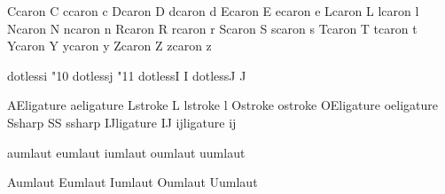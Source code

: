  Ccaron {\buildtextaccent\textcaron C}
 ccaron {\buildtextaccent\textcaron c}
 Dcaron {\buildtextaccent\textcaron D}
 dcaron {\buildtextaccent\textcaron d}
 Ecaron {\buildtextaccent\textcaron E}
 ecaron {\buildtextaccent\textcaron e}
 Lcaron {\buildtextaccent\textcaron L}
 lcaron {\buildtextaccent\textcaron l}
 Ncaron {\buildtextaccent\textcaron N}
 ncaron {\buildtextaccent\textcaron n}
 Rcaron {\buildtextaccent\textcaron R}
 rcaron {\buildtextaccent\textcaron r}
 Scaron {\buildtextaccent\textcaron S}
 scaron {\buildtextaccent\textcaron s}
 Tcaron {\buildtextaccent\textcaron T}
 tcaron {\buildtextaccent\textcaron t}
 Ycaron {\buildtextaccent\textcaron Y}
 ycaron {\buildtextaccent\textcaron y}
 Zcaron {\buildtextaccent\textcaron Z}
 zcaron {\buildtextaccent\textcaron z}

 dotlessi    {\char"10 }
 dotlessj    {\char"11 }
 dotlessI    {I}
 dotlessJ    {J}


 AEligature  { } %
 aeligature  { } %
 Lstroke     {L}
 lstroke     {l}
 Ostroke     { } %
 ostroke     { } %
 OEligature  { } %
 oeligature  { } %
 Ssharp      {SS}
 ssharp      { } %
 IJligature  {IJ}
 ijligature  {ij}

 aumlaut {\moveaccent{-.1ex}\adiaeresis}
 eumlaut {\moveaccent{-.1ex}\ediaeresis}
 iumlaut {\moveaccent{-.1ex}\idiaeresis}
 oumlaut {\moveaccent{-.1ex}\odiaeresis}
 uumlaut {\moveaccent{-.1ex}\udiaeresis}

 Aumlaut {\smashaccent\Adiaeresis}
 Eumlaut {\smashaccent\Ediaeresis}
 Iumlaut {\smashaccent\Idiaeresis}
 Oumlaut {\smashaccent\Odiaeresis}
 Uumlaut {\smashaccent\Udiaeresis}

